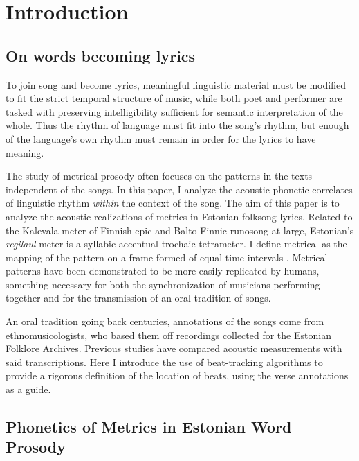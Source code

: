 \chapter{Introduction}

\section{On words becoming lyrics}
To join song and become lyrics, meaningful linguistic material must be modified to fit the strict temporal structure of music, while both poet and performer are tasked with preserving intelligibility sufficient for semantic interpretation of the whole. Thus the rhythm of language must fit into the song's rhythm, but enough of the language's own rhythm must remain in order for the lyrics to have meaning. 

The study of metrical prosody often focuses on the patterns in the texts independent of the songs. In this paper, I analyze the acoustic-phonetic correlates of linguistic rhythm {\it within} the context of the song. The aim of this paper is to analyze the acoustic realizations of metrics in Estonian folksong lyrics. 
Related to the Kalevala meter of Finnish epic and Balto-Finnic runosong at large, Estonian's {\it regilaul} meter is a syllabic-accentual trochaic tetrameter.  
 I define metrical as the mapping of the pattern on a frame formed of equal time intervals  \citep{essensPovel1985}. Metrical patterns have been demonstrated to be more easily replicated by humans, something necessary for both the synchronization of musicians performing together and for the transmission of an oral tradition of songs. 
 
  
   
 An oral tradition going back centuries, annotations of the songs come from ethnomusicologists, who based them off recordings collected for the Estonian Folklore Archives. 
  Previous studies have compared acoustic measurements with said transcriptions. 
Here I introduce the use of beat-tracking algorithms to provide a rigorous definition of the location of beats, using the verse annotations as a guide. 


\section{Phonetics of Metrics in Estonian Word Prosody}

